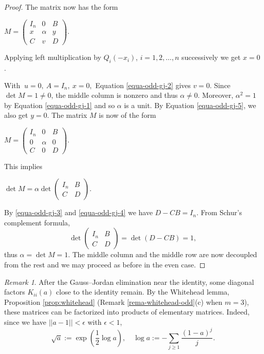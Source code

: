 \documentclass[11pt]{amsart}
\theoremstyle{definition}
\theoremstyle{remark}
\theoremstyle{remark}
\newtheorem{remark}[theorem]{Remark}
\begin{document}
\begin{proof}
The matrix now has the form
\begin{center}
    $M=
\begin{pmatrix}
I_n&0&B\\
x&\alpha&y\\
C&v&D
\end{pmatrix}.$
\end{center}
Applying left multiplication by $Q_i(-x_i)$, $i = 1, 2, \dots, n$ successively we get $x= 0$. 

With $\ u=0,\ A=I_n,\ x=0,$ Equation \eqref{equa-odd-gj-2} gives $v=0$. Since $\det M = 1 \neq 0$, the middle column is nonzero and thus $\alpha \neq 0$. Moreover, $\alpha^2=1$ by Equation \eqref{equa-odd-gj-1} and so $\alpha$ is a unit. 
By Equation \eqref{equa-odd-gj-5}, we also get $y=0$. The matrix $M$ is now of the form 
\begin{center}
$M=
\begin{pmatrix}
I_n&0&B\\
0&\alpha&0\\
C&0&D
\end{pmatrix}.$
\end{center}
This implies
\begin{center}
$\det M = \alpha \det \begin{pmatrix} I_n &B\\ C&D\end{pmatrix}$.
\end{center}
By \eqref{equa-odd-gj-3} and \eqref{equa-odd-gj-4} we have $D-CB = I_n$. From Schur's complement formula, 
$$
    \det \begin{pmatrix} I_n &B\\ C&D\end{pmatrix} = \det( D - CB) = 1, 
$$
thus $\alpha = \det M=1$. The middle column and the middle row are now decoupled from the rest and we may proceed as before in the even case.
\end{proof}

\begin{remark} \label{rmk-K_ii}
    After the Gauss--Jordan elimination near the identity, some diagonal factors $K_{ii}(a)$ close to the identity remain. 
    By the Whitehead lemma, Proposition \ref{prop:whitehead} (Remark \ref{rema-whitehead-odd}(c) when $m=3$), these matrices can be factorized into products of elementary matrices. Indeed, since we have $||a - 1|| < \epsilon$ with $\epsilon < 1$,
    \[
    \sqrt{a} := \exp (\frac{1}{2} \log a ), \quad \log a:= - \sum_{j \ge 1} \frac{(1-a)^j}{j}.
    \]
\end{remark}
\end{document}
